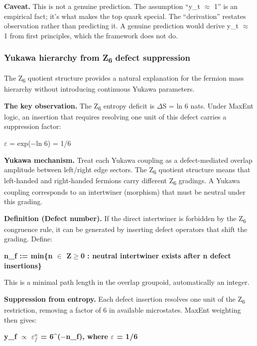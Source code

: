 \documentclass[11pt,a4paper]{article}
\theoremstyle{remark}
\begin{document}
\textbf{Caveat.} This is not a genuine prediction. The assumption ``y\_t \ensuremath{\approx} 1'' is an empirical fact; it's what makes the top quark special. The ``derivation'' restates observation rather than predicting it. A genuine prediction would derive y\_t \ensuremath{\approx} 1 from first principles, which the framework does not do.

\subsubsection{\texorpdfstring{Yukawa hierarchy from Z\textsubscript{6} defect suppression}{Yukawa hierarchy from Z defect suppression}}\label{yukawa-hierarchy-from-z-defect-suppression}

The Z\textsubscript{6} quotient structure provides a natural explanation for the fermion
mass hierarchy without introducing continuous Yukawa parameters.

\textbf{The key observation.} The Z\textsubscript{6} entropy deficit is \ensuremath{\Delta}S = ln 6 nats. Under MaxEnt logic, an insertion that requires resolving one unit of this defect carries a suppression factor:

\ensuremath{\varepsilon} = exp(\ensuremath{-}ln 6) = 1/6

\textbf{Yukawa mechanism.} Treat each Yukawa coupling as a defect-mediated overlap amplitude between left/right edge sectors. The Z\textsubscript{6} quotient structure means that left-handed and right-handed fermions carry different Z\textsubscript{6} gradings. A Yukawa coupling corresponds to an intertwiner (morphism) that must be neutral under this grading.

\textbf{Definition (Defect number).} If the direct intertwiner is forbidden by the Z\textsubscript{6} congruence rule, it can be generated by inserting defect operators that shift the grading. Define:

\textbf{n\_f := min\{n \ensuremath{\in} Z\ensuremath{\geq}0 : neutral intertwiner exists after n defect insertions\}}

This is a minimal path length in the overlap groupoid, automatically an integer.

\textbf{Suppression from entropy.} Each defect insertion resolves one unit of the Z\textsubscript{6} restriction, removing a factor of 6 in available microstates. MaxEnt weighting then gives:

\textbf{y\_f \ensuremath{\propto} \(\varepsilon^n_f\) = 6\^{}(\ensuremath{-}n\_f), where \ensuremath{\varepsilon} = 1/6}
\end{document}
